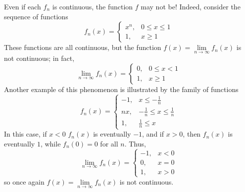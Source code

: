 \documentclass[12pt, a4paper, oneside, openright, titlepage]{book}
\begin{document}
\begin{eg}
    Even if each $f_n$ is continuous, the function $f$ may not be! Indeed, consider the sequence of functions \begin{equation*}
        f_n(x) = \left\{\begin{array}{lc} x^n, & 0\leq x \leq 1 \\ 1, & x \geq 1 \end{array}\right.
    \end{equation*}
    These functions are all continuous, but the function $f(x) = \lim\limits_{n\rightarrow \infty}f_n(x)$ is not continuous; in fact, \begin{equation*}
        \lim\limits_{n\rightarrow \infty}f_n(x) = \left\{\begin{array}{lc} 0, & 0\leq x < 1 \\ 1, & x \geq 1 \end{array}\right.
    \end{equation*}
    Another example of this phenomenon is illustrated by the family of functions \begin{equation*}
        f_n(x) = \left\{\begin{array}{lc} -1, &  x \leq -\frac{1}{n} \\ nx, & -\frac{1}{n} \leq x \leq \frac{1}{n} \\ 1, & \frac{1}{n} \leq x \end{array}\right.
    \end{equation*}
    In this case, if $x < 0$ $f_n(x)$ is eventually $-1$, and if $x > 0$, then $f_n(x)$ is eventually $1$, while $f_n(0) = 0$ for all $n$. Thus, \begin{equation*}
        \lim\limits_{n\rightarrow \infty}f_n(x) = \left\{\begin{array}{lc} -1, & x < 0 \\ 0, & x = 0 \\ 1, & x > 0 \end{array}\right.
    \end{equation*}
    so once again $f(x) = \lim\limits_{n\rightarrow \infty}f_n(x)$ is not continuous.
\end{eg}
\end{document}
